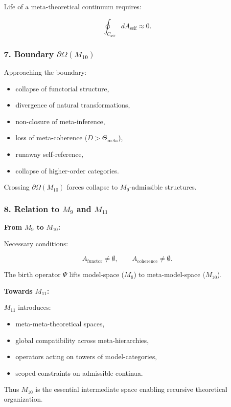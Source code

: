 Life of a meta-theoretical continuum requires:

\[
\oint_{C_{\mathrm{self}}} dA_{\mathrm{self}} \approx 0.
\]

\subsubsection*{7. Boundary $\partial\Omega(M_{10})$}

Approaching the boundary:

\begin{itemize}
    \item collapse of functorial structure,
    \item divergence of natural transformations,
    \item non-closure of meta-inference,
    \item loss of meta-coherence ($D>\Theta_{\mathrm{meta}}$),
    \item runaway self-reference,
    \item collapse of higher-order categories.
\end{itemize}

Crossing $\partial\Omega(M_{10})$ forces collapse to $M_9$-admissible structures.

\subsubsection*{8. Relation to \texorpdfstring{$M_9$}{M_9} and $M_{11}$}

\textbf{From $M_9$ to $M_{10}$:}

Necessary conditions:

\[
A_{\mathrm{functor}}\neq\emptyset,\qquad
A_{\mathrm{coherence}}\neq\emptyset.
\]

The birth operator $\Psi$ lifts model-space ($M_9$) to meta-model-space ($M_{10}$).

\textbf{Towards $M_{11}$:}

$M_{11}$ introduces:

\begin{itemize}
    \item meta-meta-theoretical spaces,
    \item global compatibility across meta-hierarchies,
    \item operators acting on towers of model-categories,
    \item scoped constraints on admissible continua.
\end{itemize}

Thus $M_{10}$ is the essential intermediate space enabling 
recursive theoretical organization.
